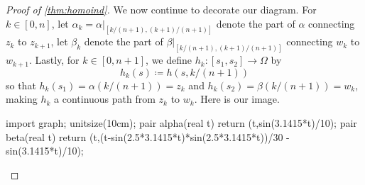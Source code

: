 \documentclass[../notes.tex]{subfiles}
\begin{document}
\begin{proof}[Proof of \autoref{thm:homoind}]
	We now continue to decorate our diagram. For $k\in[0,n]$, let $\alpha_k=\alpha|_{[k/(n+1),(k+1)/(n+1)]}$ denote the part of $\alpha$ connecting $z_k$ to $z_{k+1}$, let $\beta_k$ denote the part of $\beta|_{[k/(n+1),(k+1)/(n+1)]}$ connecting $w_k$ to $w_{k+1}$. Lastly, for $k\in[0,n+1]$, we define $h_k\colon [s_1,s_2]\to\Omega$ by
	\[h_k(s)\coloneqq h(s,k/(n+1))\]
	so that $h_k(s_1)=\alpha(k/(n+1))=z_k$ and $h_k(s_2)=\beta(k/(n+1))=w_k$, making $h_k$ a continuous path from $z_k$ to $w_k$. Here is our image.
	\begin{center}
		\begin{asy}
			import graph;
			unitsize(10cm);
			pair alpha(real t)
			{
				return (t,sin(3.1415*t)/10);
			}
			pair beta(real t)
			{
				return (t,(t-sin(2.5*3.1415*t)*sin(2.5*3.1415*t))/30 - sin(3.1415*t)/10);
			}


\end{asy}
\end{center}
\end{proof}
\end{document}
